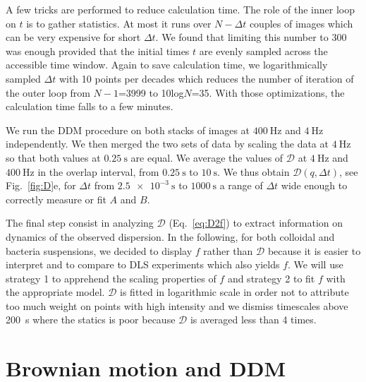 \documentclass[prb,twocolumn,amsmath,amssymb]{revtex4-1}
\newcommand{\tgn}[1]{{\color{blue}#1}} %
\begin{document}
A few tricks are performed to reduce calculation time. The role of the inner loop on $t$ is to gather statistics. At most it runs over $N-\Delta t$ couples of images which can be very expensive for short $\Delta t$. We found that limiting this number to 300 was enough provided that the initial times $t$ are evenly sampled across the accessible time window. Again to save calculation time, we logarithmically sampled $\Delta t$ with 10 points per decades which reduces the number of iteration of the outer loop from $N-1$=3999 to 10log$N$=35. With those optimizations, the calculation time falls to a few minutes. 

We run the DDM procedure on both stacks of images at $\SI{400}{\hertz}$ and $\SI{4}{\hertz}$ independently. We then merged the two sets of data by scaling the data at $\SI{4}{\hertz}$ so that both values at $\SI{0.25}{\second}$ are equal. We average the values of $\mathcal{D}$ at $\SI{4}{\hertz}$ and $\SI{400}{\hertz}$ in the overlap interval, from $\SI{0.25}{\second}$ to $\SI{10}{\second}$. We thus obtain $\mathcal{D} (q, \Delta t)$, see Fig.~\ref{fig:D}e, for $\Delta t$ from $\SI{2.5e-3}{\second}$ to $\SI{1000}{\second}$ a range of $\Delta t$ wide enough to correctly measure or fit $A$ and $B$.

The final step consist in analyzing $\mathcal{D}$ (Eq.~\ref{eq:D2f}) to extract information on dynamics of the observed dispersion. In the following, for both colloidal and bacteria suspensions, we decided to display $f$ rather than $\mathcal{D}$ because it is easier to interpret and to compare to DLS experiments \tgn{which also yields $f$}. We will use strategy 1 to apprehend the scaling properties of $f$ and strategy 2 to fit $f$ with the appropriate model. $\mathcal{D}$ is fitted in logarithmic scale in order not to attribute too much weight on points with high intensity and we dismiss timescales above \SI{200}{\second} where the statics is poor because $\mathcal{D}$ is averaged less than 4 times.

\section{Brownian motion and DDM}
\label{sec:BrownSection}
\end{document}
